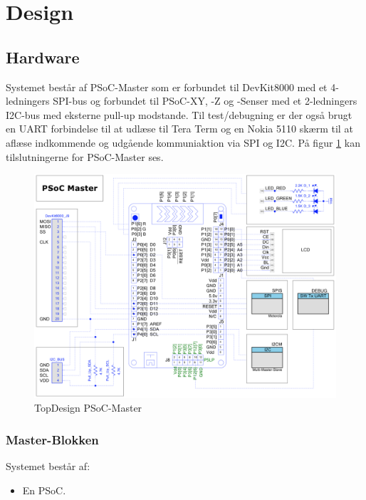 \section{Design}

\subsection{Hardware}

Systemet består af PSoC-Master som er forbundet til DevKit8000 med et 4-ledningers SPI-bus og forbundet til PSoC-XY, -Z og -Senser med et 2-ledningers I2C-bus med eksterne pull-up modstande. Til test/debugning er der også brugt en UART forbindelse til at udlæse til Tera Term og en Nokia 5110 skærm til at aflæse indkommende og udgående kommuniaktion via SPI og I2C. På figur \ref{fig:psoc-master_topdesign} kan tilslutningerne for PSoC-Master ses.

\begin{figure}[H] \centering
    \includegraphics[width=\textwidth]{Filer/PSoC-Master_TopDesign.png}
    \caption{TopDesign PSoC-Master}
    \label{fig:psoc-master_topdesign}
\end{figure}

\subsubsection{Master-Blokken}
Systemet består af:
\begin{itemize}
	\item En PSoC.
\end{itemize}

